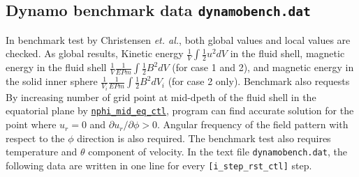 \subsection{Dynamo benchmark data {\tt dynamobench.dat}}
 In benchmark test by Christensen {\it et. al.}, both global values and local values are checked. As global results, Kinetic energy 
 $\displaystyle{ \frac{1}{V} \int \frac{1}{2} u^{2} dV}$ in the fluid shell, magnetic energy in the fluid shell 
 $\displaystyle{ \frac{1}{V} \frac{1}{E Pm} \int \frac{1}{2} B^{2} dV}$ (for case 1 and 2), and magnetic energy in the solid inner sphere 
 $\displaystyle{ \frac{1}{V_{i}} \frac{1}{E Pm} \int \frac{1}{2} B^{2} dV_{i}}$ (for case 2 only). Benchmark also requests 
 By increasing number of grid point at mid-dpeth of the fluid shell in the equatorial plane by \hyperref[href_t:nphi_mid_eq_ctl]{{\tt nphi\_mid\_eq\_ctl}}, program can find accurate solution for the point where $u_{r} = 0$ and $\partial u_{r} / \partial \phi > 0$. Angular frequency of the field pattern with respect to the $\phi$ direction is also required. The benchmark test also requires temperature and $\theta$ component of velocity. In the text file {\tt dynamobench.dat}, the following data are written in one line for every \verb|[i_step_rst_ctl]| step.
%
